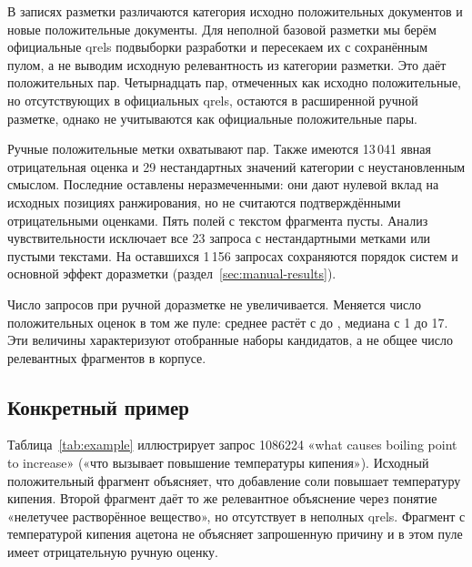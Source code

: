 \documentclass[runningheads,a4paper]{llncs}
\begin{document}
В записях разметки различаются категория исходно положительных документов и новые положительные документы. Для неполной базовой разметки мы берём официальные qrels подвыборки разработки и пересекаем их с сохранённым пулом, а не выводим исходную релевантность из категории разметки. Это даёт \OriginalPositiveCount{} положительных пар. Четырнадцать пар, отмеченных как исходно положительные, но отсутствующих в официальных qrels, остаются в расширенной ручной разметке, однако не учитываются как официальные положительные пары.

Ручные положительные метки охватывают \HumanPositiveCount{} пар. Также имеются 13\,041 явная отрицательная оценка и 29 нестандартных значений категории с неустановленным смыслом. Последние оставлены неразмеченными: они дают нулевой вклад на исходных позициях ранжирования, но не считаются подтверждёнными отрицательными оценками. Пять полей с текстом фрагмента пусты. Анализ чувствительности исключает все 23 запроса с нестандартными метками или пустыми текстами. На оставшихся 1\,156 запросах сохраняются порядок систем и основной эффект доразметки (раздел~\ref{sec:manual-results}).



Число запросов при ручной доразметке не увеличивается. Меняется число положительных оценок в том же пуле: среднее растёт с \OriginalMeanRel{} до \HumanMeanRel{}, медиана с 1 до 17. Эти величины характеризуют отобранные наборы кандидатов, а не общее число релевантных фрагментов в корпусе.

\subsection{Конкретный пример}
\label{sec:example}

Таблица~\ref{tab:example} иллюстрирует запрос 1086224 «what causes boiling point to increase» («что вызывает повышение температуры кипения»). Исходный положительный фрагмент объясняет, что добавление соли повышает температуру кипения. Второй фрагмент даёт то же релевантное объяснение через понятие «нелетучее растворённое вещество», но отсутствует в неполных qrels. Фрагмент с температурой кипения ацетона не объясняет запрошенную причину и в этом пуле имеет отрицательную ручную оценку.
\end{document}
